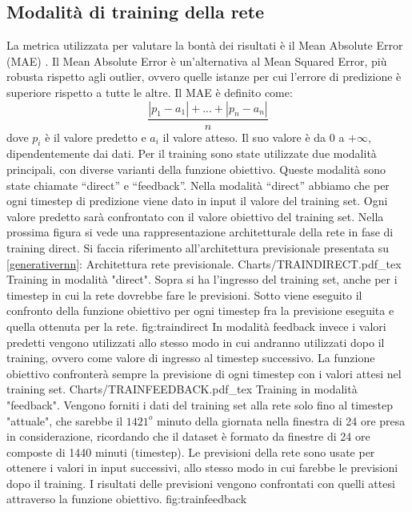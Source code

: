 \subsection{Modalità di training della rete}
La metrica utilizzata per valutare la bontà dei risultati è il Mean Absolute Error (MAE) \cite{witten}. Il Mean Absolute Error è un’alternativa al Mean Squared Error, più robusta rispetto agli outlier, ovvero quelle istanze per cui l’errore di predizione è superiore rispetto a tutte le altre. Il MAE è definito come:
\[ \frac{ |p_1 - a_1| + ... + |p_n - a_n| }{n} \]
dove $ p_i $ è il valore predetto e $ a_i $ il valore atteso. Il suo valore è da $ 0 $ a $ +\infty $, dipendentemente dai dati. Per il training sono state utilizzate due modalità principali, con diverse varianti della funzione obiettivo. Queste modalità sono state chiamate “direct” e “feedback”. Nella modalità “direct” abbiamo che per ogni timestep di predizione viene dato in input il valore del training set. Ogni valore predetto sarà confrontato con il valore obiettivo del training set. Nella prossima figura si vede una rappresentazione architetturale della rete in fase di training direct. Si faccia riferimento all'architettura previsionale presentata su \ref{generativernn}: Architettura rete previsionale.
\svg
{Charts/TRAINDIRECT.pdf_tex}
{Training in modalità "direct". Sopra si ha l'ingresso del training set, anche per i timestep in cui la rete dovrebbe fare le previsioni. Sotto viene eseguito il confronto della funzione obiettivo per ogni timestep fra la previsione eseguita e quella ottenuta per la rete. }
{fig:traindirect}
In modalità feedback invece i valori predetti vengono utilizzati allo stesso modo in cui andranno utilizzati dopo il training, ovvero come valore di ingresso al timestep successivo. La funzione obiettivo confronterà sempre la previsione di ogni timestep con i valori attesi nel training set. 
\svg
{Charts/TRAINFEEDBACK.pdf_tex}
{Training in modalità "feedback". Vengono forniti i dati del training set alla rete solo fino al timestep "attuale", che sarebbe il $ 1421^{o} $ minuto della giornata nella finestra di 24 ore presa in considerazione, ricordando che il dataset è formato da finestre di 24 ore composte di 1440 minuti (timestep). Le previsioni della rete sono usate per ottenere i valori in input successivi, allo stesso modo in cui farebbe le previsioni dopo il training. I risultati delle previsioni vengono confrontati con quelli attesi attraverso la funzione obiettivo. }
{fig:trainfeedback}
